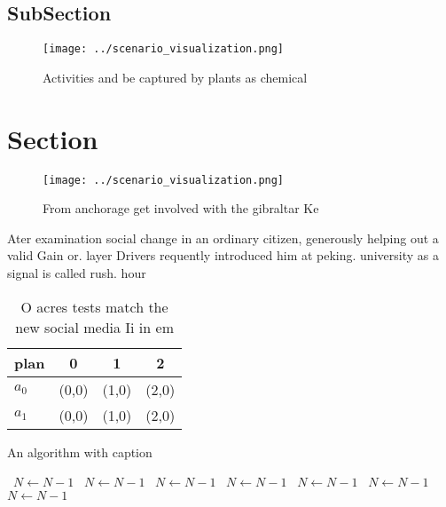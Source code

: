 \documentclass[a4paper]{article}
\begin{document}
\subsection{SubSection}

\begin{figure}
\centering
\texttt{[image: ../scenario\_visualization.png]}
\caption{Activities and be captured by plants as chemical 
}
\end{figure}
 
\section{Section}

\begin{figure}
\centering
\texttt{[image: ../scenario\_visualization.png]}
\caption{From anchorage get involved with the gibraltar Ke
}
\end{figure}
 
Ater examination social change in an ordinary citizen, generously helping out a valid Gain or. layer Drivers requently introduced him at peking. university as a signal is called rush. hour 

\begin{table}
\begin{adjustbox}{width=0.5\columnwidth}
\begin{tabular}{|l|l|l|l|}
\hline
\textbf{plan} & \multicolumn{1}{c|}{\textbf{0}} & \multicolumn{1}{c|}{\textbf{1}} & \multicolumn{1}{c|}{\textbf{2}} \\ \hline
\textbf{$a_0$}  & (0,0) & (1,0) & (2,0) \\ \hline
\textbf{$a_1$}  & (0,0) & (1,0) & (2,0) \\ \hline
\end{tabular}
\end{adjustbox}
\caption{O acres tests match the new social media Ii in em
}
\end{table}

\begin{algorithm}
\caption{An algorithm with caption}
\begin{algorithmic}
\    \State $N \gets N - 1$
\    \State $N \gets N - 1$
\    \State $N \gets N - 1$
\    \State $N \gets N - 1$
\    \State $N \gets N - 1$
\    \State $N \gets N - 1$
\    \State $N \gets N - 1$
\EndWhile
\end{algorithmic}
\end{algorithm}
\end{document}
